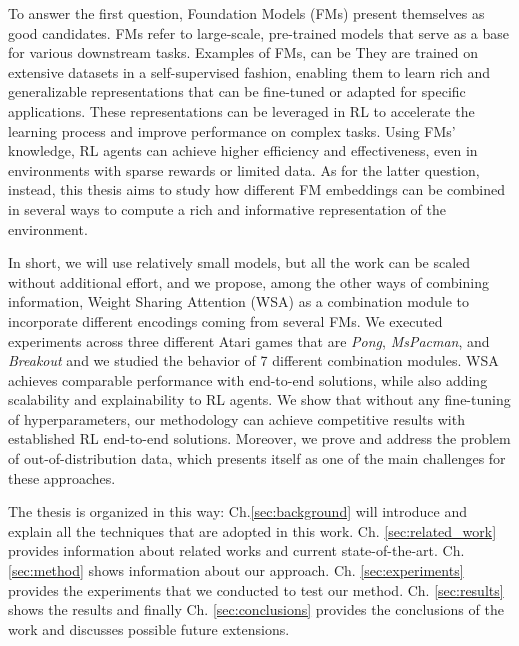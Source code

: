 To answer the first question, Foundation Models (FMs) present themselves as good candidates.
FMs refer to large-scale, pre-trained models that serve as a base for various downstream tasks.
Examples of FMs, can be \citet{brown2020language, devlin2018bert, he2016deep}
They are trained on extensive datasets in a self-supervised fashion, enabling them to learn rich and generalizable representations that can be fine-tuned or adapted for specific applications. 
These representations can be leveraged in RL to accelerate the learning process and improve performance on complex tasks. Using FMs' knowledge, RL agents can achieve higher efficiency and effectiveness, even in environments with sparse rewards or limited data. 
As for the latter question, instead, this thesis aims to study how different FM embeddings can be combined in several ways to compute a rich and informative representation of the environment. 


In short, we will use relatively small models, but all the work can be scaled without additional effort, and we propose, among the other ways of combining information, Weight Sharing Attention (WSA) as a combination module to incorporate different encodings coming from several FMs.
We executed experiments across three different Atari games that are \textit{Pong}, \textit{MsPacman}, and \textit{Breakout} and we studied the behavior of 7 different combination modules.
WSA achieves comparable performance with end-to-end solutions, while also adding scalability and explainability to RL agents.
We show that without any fine-tuning of hyperparameters, our methodology can achieve competitive results with established RL end-to-end solutions. Moreover, we prove and address the problem of out-of-distribution data, which presents itself as one of the main challenges for these approaches. 


The thesis is organized in this way: Ch.\ref{sec:background} will introduce and explain all the techniques that are adopted in this work. Ch. \ref{sec:related_work} provides information about related works and current state-of-the-art. Ch. \ref{sec:method} shows information about our approach. Ch. \ref{sec:experiments} provides the experiments that we conducted to test our method. Ch. \ref{sec:results} shows the results and finally Ch. \ref{sec:conclusions} provides the conclusions of the work and discusses possible future extensions.
